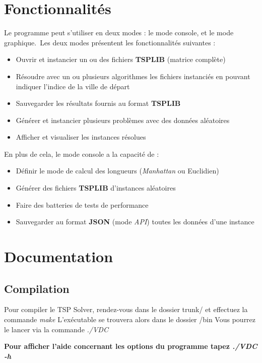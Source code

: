 \documentclass[12pt]{report}
\begin{document}
\section{Fonctionnalités}

Le programme peut s'utiliser en deux modes : le mode console, et le mode graphique.\
Les deux modes présentent les fonctionnalités suivantes : \
\begin{itemize}
	\item Ouvrir et instancier un ou des fichiers \textbf{TSPLIB} (matrice complète)
	\item Résoudre avec un ou plusieurs algorithmes les fichiers instanciés en pouvant indiquer l'indice de la ville de départ
    \item Sauvegarder les résultats fournis au format \textbf{TSPLIB}
    \item Générer et instancier plusieurs problèmes avec des données aléatoires
    \item Afficher et visualiser les instances résolues \newline
\end{itemize}
En plus de cela, le mode console a la capacité de :
\begin{itemize}
	\item Définir le mode de calcul des longueurs (\textit{Manhattan} ou Euclidien)
    \item Générer des fichiers \textbf{TSPLIB} d'instances aléatoires
    \item Faire des batteries de tests de performance
    \item Sauvegarder au format \textbf{JSON} (mode \textit{API}) toutes les données d'une instance 
\end{itemize}


\section{Documentation}

\subsection{Compilation}

Pour compiler le TSP Solver, rendez-vous dans le dossier trunk/ et effectuez la commande \emph{make}
L'exécutable se trouvera alors dans le dossier /bin
Vous pourrez le lancer via la commande \emph{./VDC}

\textbf{Pour afficher l'aide concernant les options du programme tapez \emph{./VDC -h}}
\end{document}
